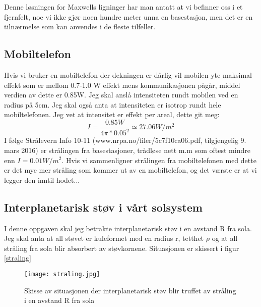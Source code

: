 \documentclass[a4paper,12pt,norsk]{article}
\begin{document}
Denne løsningen for Maxwells ligninger har man antatt at vi befinner oss i et fjernfelt, noe vi ikke gjør noen hundre meter unna en basestasjon, men det er en tilnærmelse som kan anvendes i de fleste tilfeller. 

\subsection{Mobiltelefon}
Hvis vi bruker en mobiltelefon der dekningen er dårlig vil mobilen yte maksimal effekt som er mellom 0.7-1.0 W effekt mens kommunikasjonen pågår, middel verdien av dette er 0.85W. Jeg skal anslå intensiteten rundt mobilen ved en radius på 5cm. Jeg skal også anta at intensiteten er isotrop rundt hele mobiltelefonen. Jeg vet at intensitet er effekt per areal, dette git meg:
$$
I = \frac{0.85 W}{4\pi*0.05^2} \simeq 27.06 W/m^2
$$
I følge Strålevern Info 10-11 (www.nrpa.no/filer/5c7f10ca06.pdf, tilgjengelig 9. mars 2016) er strålingen fra basestasjoner, trådløse nett m.m som oftest mindre enn $I=0.01W/m^2$. Hvis vi sammenligner strålingen fra mobiltelefonen med dette er det mye mer stråling som kommer ut av en mobiltelefon, og det værste er at vi legger den inntil hodet...

\subsection{Interplanetarisk støv i vårt solsystem}
I denne oppgaven skal jeg betrakte interplanetarisk støv i en avstand R fra sola. Jeg skal anta at all støvet er kuleformet med en radius r, tetthet $\rho$ og at all stråling fra sola blir absorbert av støvkornene. Situasjonen er skissert i figur \vref{straling}

\begin{figure}
\texttt{[image: straling.jpg]} 
\caption[Skisse interplanetarisk støv]{Skisse av situasjonen der interplanetarisk støv blir truffet av stråling i en avstand R fra sola}
\label{straling}
\end{figure}
\end{document}
